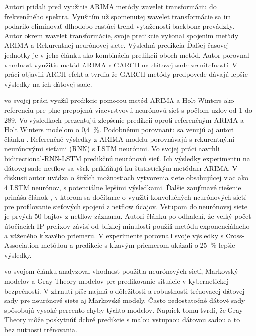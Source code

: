 \documentclass[thesismargins, thesislinespacing, openright, upjsfrontpage, combineabstracts]{rnthesis}
\begin{document}
Autori \cite{madan2018predicting,papagiannaki2005long} pridali pred využitie ARIMA metódy wavelet transformáciu do frekvenčného spektra. Využitím už spomenutej wavelet transformácie sa im podarilo eliminovať dlhodobo rastúci trend vyťaženosti backbone prevádzky. Autor \cite{madan2018predicting} okrem wavelet transformácie, svoje predikcie vykonal spojením metódy ARIMA a Rekurentnej neurónovej siete. Výsledná predikcia Ďalšej časovej jednotky je v jeho článku ako kombinácia predikcií oboch metód. Autor \cite{tang2016exploiting} porovnal vhodnosť využitia metód ARIMA a GARCH na dátovej sade zraniteľností. V práci objavili ARCH efekt a tvrdia že GARCH metódy predpovede dávajú lepšie výsledky na ich dátovej sade.

\cite{cortez2012multi} vo svojej práci využil predikcie pomocou metód ARIMA a Holt-Winters ako referenciu pre plne prepojenú viacvrstvovú neurónovú sieť s počtom uzlov od 1 do 289. Vo výsledkoch prezentujú zlepšenie predikcií oproti referenčným ARIMA a Holt Winters modelom o 0,4~\%. Podobnému porovnaniu sa venujú aj autori článku \cite{fang2019deep}. Referenčné výsledky z ARIMA modelu porovnávajú s rekurentnými neurónovými sieťami (RNN) s LSTM neurónmi. Vo svojej práci navrhli bidirectional-RNN-LSTM predikčnú neurónovú sieť. Ich výsledky experimentu na dátovej sade netflow sa však prikláňajú ku štatistickým metódam ARIMA. V diskusii autor uvádza o širších možnostiach vytvorenia siete obsahujúcej viac ako 4 LSTM neurónov, s potenciálne lepšími výsledkami. Ďalšie zaujímavé riešenie prináša článok \cite{millar2019using}, v ktorom sa dočítame o využití konvolučných neurónových sietí pre profilovanie sieťových spojení z netflow údajov. Vstupom do neurónovej siete je prvých 50 bajtov z netflow záznamu. Autori článku \cite{soldo2011blacklisting} po odhalení, že veľký počet útočiacich IP prefixov závisí od blízkej minulosti použili metódu exponenciálneho a váženého kĺzavého priemeru. V experimente porovnali svoje výsledky s Cross-Association metódou a predikcie s kĺzavým priemerom ukázali o 25~\% lepšie výsledky.

\cite{Leau2015} vo svojom článku analyzoval vhodnosť použitia neurónových sietí, Markovský modelov a Gray Theory modelov pre predikovanie situácie v kybernetickej bezpečnosti. V zhrnutí píše najmä o dôležitosti a robustnosti trénovacej dátovej sady pre neurónové siete aj Markovské modely. Často nedostatočné dátové sady spôsobujú vysoké percento chyby týchto modelov. Napriek tomu tvrdí, že Gray Theory môže poskytnúť dobré predikcie s malou vstupnou dátovou sadou a to bez nutnosti trénovania.
\end{document}
